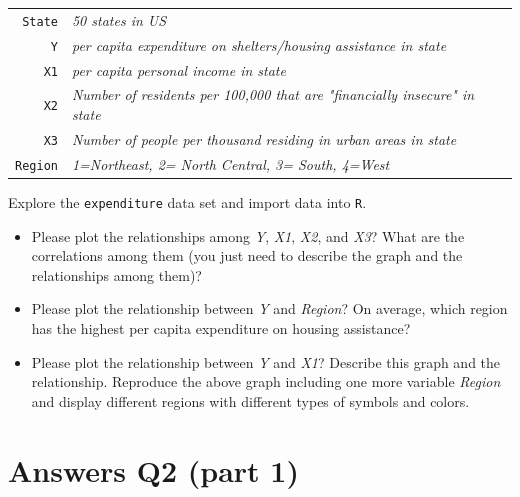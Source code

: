 \documentclass[12pt,letterpaper]{article}
\begin{document}
\begin{tabular}{r|l}
	\texttt{State} &\emph{50 states in US} \\
	\texttt{Y} & \emph{per capita expenditure on shelters/housing assistance in state}\\
	\texttt{X1} &\emph{per capita personal income in state} \\
	\texttt{X2} &  \emph{Number of residents per 100,000 that are "financially insecure" in state}\\
	\texttt{X3} &  \emph{Number of people per thousand residing in urban areas in state} \\
	\texttt{Region} &  \emph{1=Northeast, 2= North Central, 3= South, 4=West} \\
\end{tabular}

\vspace{.5cm}
\noindent Explore the \texttt{expenditure} data set and import data into \texttt{R}.
\vspace{.5cm}
  
\vspace{.5cm}
\begin{itemize}

\item
Please plot the relationships among \emph{Y}, \emph{X1}, \emph{X2}, and \emph{X3}? What are the correlations among them (you just need to describe the graph and the relationships among them)?
\vspace{.5cm}
\item
Please plot the relationship between \emph{Y} and \emph{Region}? On average, which region has the highest per capita expenditure on housing assistance?
\vspace{.5cm}
\item
Please plot the relationship between \emph{Y} and \emph{X1}? Describe this graph and the relationship. Reproduce the above graph including one more variable \emph{Region} and display different regions with different types of symbols and colors.
\end{itemize}

\newpage

	\section*{Answers Q2 (part 1)}
	
	

\noindent 
\end{document}
